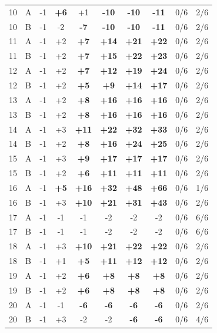 \begin{table}[htbp]
\begin{tabular}{clcccccccc}
10 & A & -1 & \textbf{+6} & +1 & \textbf{-10} & \textbf{-10} & \textbf{-11} & 0/6 & 2/6 \\
10 & B & -1 & -2 & \textbf{-7} & \textbf{-10} & \textbf{-10} & \textbf{-11} & 0/6 & 2/6 \\
11 & A & -1 & +2 & \textbf{+7} & \textbf{+14} & \textbf{+21} & \textbf{+22} & 0/6 & 2/6 \\
11 & B & -1 & +2 & \textbf{+7} & \textbf{+15} & \textbf{+22} & \textbf{+23} & 0/6 & 2/6 \\
12 & A & -1 & +2 & \textbf{+7} & \textbf{+12} & \textbf{+19} & \textbf{+24} & 0/6 & 2/6 \\
12 & B & -1 & +2 & \textbf{+5} & \textbf{+9} & \textbf{+14} & \textbf{+17} & 0/6 & 2/6 \\
13 & A & -1 & +2 & \textbf{+8} & \textbf{+16} & \textbf{+16} & \textbf{+16} & 0/6 & 2/6 \\
13 & B & -1 & +2 & \textbf{+8} & \textbf{+16} & \textbf{+16} & \textbf{+16} & 0/6 & 2/6 \\
14 & A & -1 & +3 & \textbf{+11} & \textbf{+22} & \textbf{+32} & \textbf{+33} & 0/6 & 2/6 \\
14 & B & -1 & +2 & \textbf{+8} & \textbf{+16} & \textbf{+24} & \textbf{+25} & 0/6 & 2/6 \\
15 & A & -1 & +3 & \textbf{+9} & \textbf{+17} & \textbf{+17} & \textbf{+17} & 0/6 & 2/6 \\
15 & B & -1 & +2 & \textbf{+6} & \textbf{+11} & \textbf{+11} & \textbf{+11} & 0/6 & 2/6 \\
16 & A & -1 & \textbf{+5} & \textbf{+16} & \textbf{+32} & \textbf{+48} & \textbf{+66} & 0/6 & 1/6 \\
16 & B & -1 & +3 & \textbf{+10} & \textbf{+21} & \textbf{+31} & \textbf{+43} & 0/6 & 2/6 \\
17 & A & -1 & -1 & -1 & -2 & -2 & -2 & 0/6 & 6/6 \\
17 & B & -1 & -1 & -1 & -2 & -2 & -2 & 0/6 & 6/6 \\
18 & A & -1 & +3 & \textbf{+10} & \textbf{+21} & \textbf{+22} & \textbf{+22} & 0/6 & 2/6 \\
18 & B & -1 & +1 & \textbf{+5} & \textbf{+11} & \textbf{+12} & \textbf{+12} & 0/6 & 2/6 \\
19 & A & -1 & +2 & \textbf{+6} & \textbf{+8} & \textbf{+8} & \textbf{+8} & 0/6 & 2/6 \\
19 & B & -1 & +2 & \textbf{+6} & \textbf{+8} & \textbf{+8} & \textbf{+8} & 0/6 & 2/6 \\
20 & A & -1 & -1 & \textbf{-6} & \textbf{-6} & \textbf{-6} & \textbf{-6} & 0/6 & 2/6 \\
20 & B & -1 & +3 & -2 & -2 & \textbf{-6} & \textbf{-6} & 0/6 & 4/6 \\
\bottomrule
\end{tabular}
\end{table}

